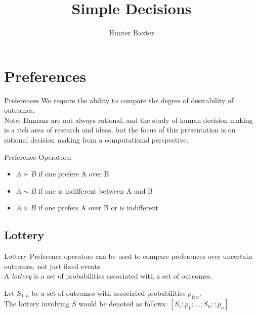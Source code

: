 \documentclass{beamer}
\title{Simple Decisions}
\author{Hunter Baxter}
\begin{document}
\maketitle

\section{Preferences}
\begin{frame}{Preferences}
We require the ability to compare the degree of desirability of outcomes. \\
Note: Humans are not always rational, and the study of human decision making is a rich area of research and ideas, but the focus of this presentation is on rational decision making from a computational perspective. 

Preference Operators:
\begin{itemize}
    \item $A \succ B$ if one prefers A over B
    \item $A \sim B$ if one is indifferent between A and B
    \item $A \succeq B$ if one prefers A over B or is indifferent
\end{itemize}
\end{frame}

\subsection{Lottery}
\begin{frame}{Lottery}
Preference operators can be used to compare preferences over uncertain outcomes, not just fixed events. \\
A \textit{lottery} is a set of probabilities associated with a set of outcomes.

Let $S_{1:n}$ be a set of outcomes with associated probabilities $p_{1:n}$. \\

The lottery involving $S$ would be denoted as follows:
$[S_1:p_1;...;S_n;:p_n]$
\end{frame}
\end{document}
